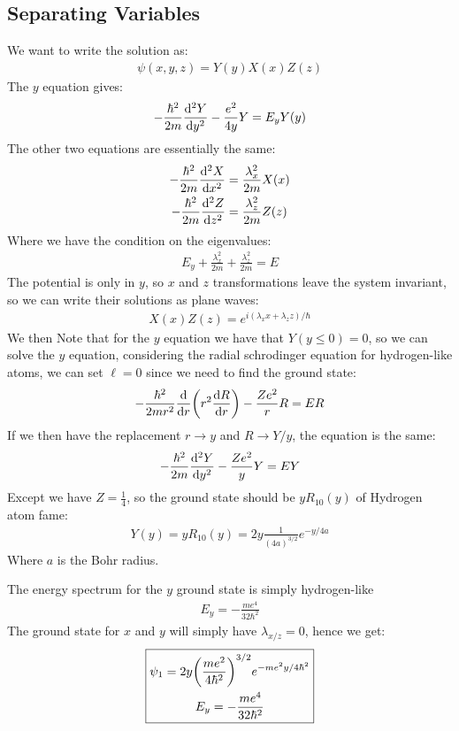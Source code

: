 \documentclass[12pt]{article}
\renewcommand{\l}{\ell}
\begin{document}
\subsection{Separating Variables}
We want to write the solution as:
\begin{align*}
  \psi(x,y,z)=Y(y)X(x)Z(z)
\end{align*}
The $y$ equation gives:
\begin{align*}
  -\frac{\hbar^2}{2m}\dv[2]{Y}{y}-\frac{e^2}{4y}Y=E_yY(y)
\end{align*}
The other two equations are essentially the same:
\begin{align*}
  -\frac{\hbar^2}{2m}\dv[2]{X}{x}&=\frac{\lambda_x^2}{2m}X(x)\\
  -\frac{\hbar^2}{2m}\dv[2]{Z}{z}&=\frac{\lambda_z^2}{2m}Z(z)
\end{align*}
Where we have the condition on the eigenvalues:
\begin{align*}
  E_y+\frac{\lambda_x^2}{2m}+\frac{\lambda^2_z}{2m}=E
\end{align*}
The potential is only in $y$, so $x$ and $z$ transformations leave the system invariant, so we can write their solutions as plane waves:
\begin{align*}
  X(x)Z(z)=e^{i(\lambda_xx+\lambda_zz)/\hbar}
\end{align*}
We then Note that for the $y$ equation we have that $Y(y\leq0)=0$, so we can solve the $y$ equation, considering the radial schrodinger equation for hydrogen-like atoms, we can set $\l=0$ since we need to find the ground state:
\begin{align*}
  -\frac{\hbar^2}{2mr^2}\dv{r}\qty(r^2\dv{R}{r})-\frac{Ze^2}{r}R=ER
\end{align*}
If we then have the replacement $r\to y$ and $R\to Y/y$, the equation is the same:
\begin{align*}
  -\frac{\hbar^2}{2m}\dv[2]{Y}{y}-\frac{Ze^2}{y}Y=EY
\end{align*}
Except we have $Z=\frac14$, so the ground state should be $yR_{10}(y)$ of Hydrogen atom fame:
\begin{align*}
  Y(y)=yR_{10}(y)=2y\frac1{(4a)^{3/2}}e^{-y/4a}
\end{align*}
Where $a$ is the Bohr radius.

The energy spectrum for the $y$ ground state is simply hydrogen-like
\begin{align*}
  E_y=-\frac{me^4}{32\hbar^2}
\end{align*}
The ground state for $x$ and $y$ will simply have $\lambda_{x/z}=0$, hence we get:
\begin{equation}
\boxed{  \begin{gathered}
    \psi_1=2y\qty(\frac{me^2}{4\hbar^2})^{3/2}e^{-me^2y/4\hbar^2}\\
    E_y=-\frac{me^4}{32\hbar^2}
  \end{gathered}}
\end{equation}
\end{document}
